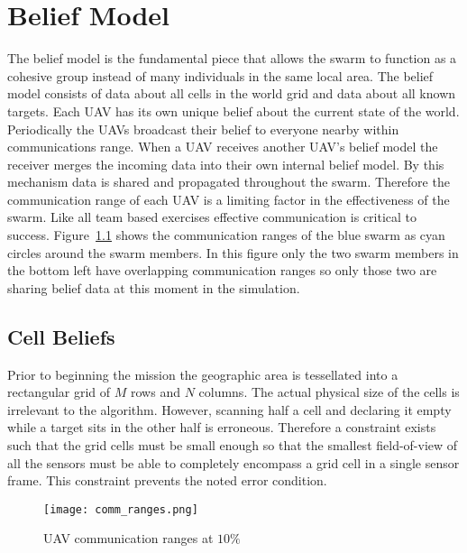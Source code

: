 \chapter{Belief Model}
\label{sec:uavBelief}
The belief model is the fundamental piece that allows the swarm to function as a cohesive group instead of many individuals in the same local area.  The belief model consists of data about all cells in the world grid and data about all known targets.  Each UAV has its own unique belief about the current state of the world.  Periodically the UAVs broadcast their belief to everyone nearby within communications range.  When a UAV receives another UAV's belief model the receiver merges the incoming data into their own internal belief model.  By this mechanism data is shared and propagated throughout the swarm.  Therefore the communication range of each UAV is a limiting factor in the effectiveness of the swarm.  Like all team based exercises effective communication is critical to success.  Figure~\ref{fig:comm_ranges} shows the communication ranges of the blue swarm as cyan circles around the swarm members.  In this figure only the two swarm members in the bottom left have overlapping communication ranges so only those two are sharing belief data at this moment in the simulation.



\section{Cell Beliefs}
Prior to beginning the mission the geographic area is tessellated into a rectangular grid of $M$ rows and $N$ columns.  The actual physical size of the cells is irrelevant to the algorithm.  However, scanning half a cell and declaring it empty while a target sits in the other half is erroneous.  Therefore a constraint exists such that the grid cells must be small enough so that the smallest field-of-view of all the sensors must be able to completely encompass a grid cell in a single sensor frame.  This constraint prevents the noted error condition.

\begin{figure}[H]
	\centering
	\texttt{[image: comm\_ranges.png]}
	\caption{UAV communication ranges at $10\%$}
	\label{fig:comm_ranges}
\end{figure}


